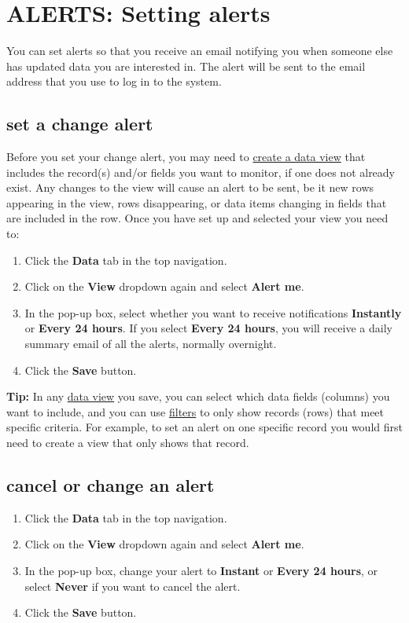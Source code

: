\documentclass{ctrlo-int-toc}
\begin{document}
\clearpage\section[ALERTS: Setting alerts]{ALERTS: Setting alerts}
You can set alerts so that you receive an email notifying you when someone else has updated data you are interested in. The alert will be sent to the email address that you use to log in to the system. 

\subsection[set a change alert ]{set a change alert }
\label{subsec:setalert}
Before you set your change alert, you may need to \hyperref[subsec:personalview]{create a data view} that includes the record(s) and/or fields you want to monitor, if one does not already exist. Any changes to the view will cause an alert to be sent, be it new rows appearing in the view, rows disappearing, or data items changing in fields that are included in the row. Once you have set up and selected your view you need to: 

\begin{enumerate}
\item Click the \textbf{Data} tab in the top navigation.
\item Click on the \textbf{View} dropdown again and select \textbf{Alert me}.
\item In the pop-up box, select whether you want to receive notifications \textbf{Instantly} or \textbf{Every 24 hours}. If you select \textbf{Every 24 hours}, you will receive a daily summary email of all the alerts, normally overnight.
\item Click the \textbf{Save} button. 
\end{enumerate}
\begin{tipbox}[userdefinedwidth=15cm]
    \textbf{Tip:} In any \hyperref[subsec:personalview]{data view} you save, you can select which data fields (columns) you want to include, and you can use \hyperref[subsec:viewstofilter]{filters} to only show records (rows) that meet specific criteria. For example, to set an alert on one specific record you would first need to create a view that only shows that record. 
\end{tipbox}

\subsection[cancel or change an alert ]{cancel or change an alert }
\label{subsec:changealert}
\begin{enumerate}
\item Click the \textbf{Data} tab in the top navigation.
\item Click on the \textbf{View} dropdown again and select \textbf{Alert me}.
\item In the pop-up box, change your alert to \textbf{Instant} or \textbf{Every 24 hours}, or select \textbf{Never} if you want to cancel the alert.
\item Click the \textbf{Save} button. 
\end{enumerate}
\end{document}
